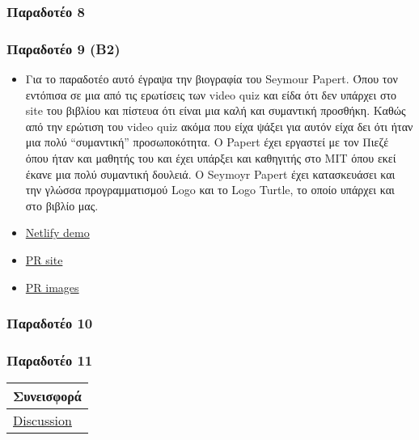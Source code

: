 \hypertarget{ux3c0ux3b1ux3c1ux3b1ux3b4ux3bfux3c4ux3adux3bf-8}{%
\subsubsection{Παραδοτέο
8}\label{ux3c0ux3b1ux3c1ux3b1ux3b4ux3bfux3c4ux3adux3bf-8}}

\hypertarget{ux3c0ux3b1ux3c1ux3b1ux3b4ux3bfux3c4ux3adux3bf-9-b2}{%
\subsubsection{Παραδοτέο 9
(B2)}\label{ux3c0ux3b1ux3c1ux3b1ux3b4ux3bfux3c4ux3adux3bf-9-b2}}

\begin{itemize}
\tightlist
\item
  Για το παραδοτέο αυτό έγραψα την βιογραφία του Seymour Papert. Όπου
  τον εντόπισα σε μια από τις ερωτίσεις των video quiz και είδα ότι δεν
  υπάρχει στο site του βιβλίου και πίστευα ότι είναι μια καλή και
  συμαντική προσθήκη. Καθώς από την ερώτιση του video quiz ακόμα που
  είχα ψάξει για αυτόν είχα δει ότι ήταν μια πολύ ``συμαντική''
  προσωποκότητα. Ο Papert έχει εργαστεί με τον Πιεζέ όπου ήταν και
  μαθητής του και έχει υπάρξει και καθηγιτής στο MIT όπου εκεί έκανε μια
  πολύ συμαντική δουλειά. Ο Seymoyr Papert έχει κατασκευάσει και την
  γλώσσα προγραμματισμού Logo και το Logo Turtle, το οποίο υπάρχει και
  στο βιβλίο μας.
\item
  \href{https://guileless-mandazi-a0b198.netlify.app/biography/saymour-papert/}{Netlify
  demo}
\item
  \href{https://github.com/Unixidized/site/pull/8}{PR site}
\item
  \href{https://github.com/Unixidized/images/pull/16}{PR images}
\end{itemize}

\hypertarget{ux3c0ux3b1ux3c1ux3b1ux3b4ux3bfux3c4ux3adux3bf-10}{%
\subsubsection{Παραδοτέο
10}\label{ux3c0ux3b1ux3c1ux3b1ux3b4ux3bfux3c4ux3adux3bf-10}}

\hypertarget{ux3c0ux3b1ux3c1ux3b1ux3b4ux3bfux3c4ux3adux3bf-11}{%
\subsubsection{Παραδοτέο
11}\label{ux3c0ux3b1ux3c1ux3b1ux3b4ux3bfux3c4ux3adux3bf-11}}

\begin{longtable}[]{@{}l@{}}
\toprule()
Συνεισφορά \\
\midrule()
\endhead
\href{https://github.com/courses-ionio/help/discussions/1156}{Discussion} \\
\bottomrule()
\end{longtable}
